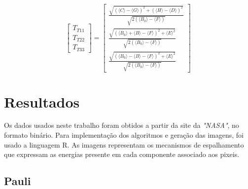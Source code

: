 \documentclass{article}
\begin{document}
\begin{equation}
    \begin{bmatrix}
        T_{T11} \\
	    T_{T22}\\
	    T_{T33}
    \end{bmatrix} = 
    \begin{bmatrix}
        \frac{\sqrt{(\langle C \rangle - \langle G \rangle)^2 + (\langle H \rangle - \langle D \rangle)^2}}{\sqrt{2 (\langle B_{0} \rangle - \langle F \rangle)}} \\
        
	    \frac{\sqrt{(\langle B_{0} \rangle + \langle B \rangle - \langle F \rangle)^2 + \langle E \rangle^2}}{\sqrt{2 (\langle B_{0} \rangle - \langle F \rangle)}} \\
	    
	    \frac{\sqrt{(\langle B_{0} \rangle - \langle B \rangle - \langle F \rangle)^2 + \langle E \rangle^2}}{\sqrt{2 (\langle B_{0} \rangle - \langle F \rangle)}}
    \end{bmatrix}
\end{equation}

\section{\textbf{Resultados}}
Os dados usados neste trabalho foram obtidos a partir da site da \textit{"NASA"}, no formato binário. Para implementação dos algoritmos e geração das imagens, foi usado a linguagem R. As imagens representam os mecanismos de espalhamento que expressam as energias presente em cada componente associado aos pixeis.

\subsection{\textbf{Pauli}}
\end{document}

